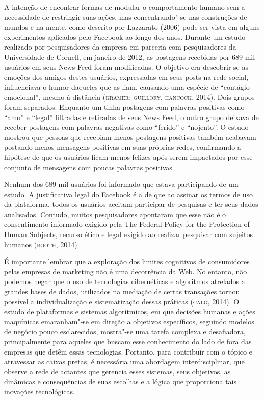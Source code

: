 A intenção de encontrar formas de modular o comportamento humano sem a
necessidade de restringir suas ações, mas concentrando"-se nas
construções de mundos e na mente, como descrito por Lazzarato (2006)
pode ser vista em alguns experimentos aplicados pelo Facebook ao longo
dos anos. Durante um estudo realizado por pesquisadores da empresa em
parceria com pesquisadores da Universidade de Cornell, em janeiro de
2012, as postagens recebidas por 689 mil usuários em seus News Feed
foram modificadas. O objetivo era descobrir se as emoções dos amigos
destes usuários, expressadas em seus posts na rede social, influenciava
o humor daqueles que as liam, causando uma espécie de ``contágio
emocional'', mesmo à distância (\textsc{kramer}; \textsc{guillory}, \textsc{hancock}, 2014). Dois
grupos foram separados. Enquanto um tinha postagens com palavras
positivas como ``amo'' e ``legal'' filtradas e retiradas de seus News
Feed, o outro grupo deixava de receber postagens com palavras negativas
como ``ferido'' e ``nojento''. O estudo mostrou que pessoas que recebiam
menos postagens positivas também acabavam postando menos mensagens
positivas em suas próprias redes, confirmando a hipótese de que os
usuários ficam menos felizes após serem impactados por esse conjunto de
mensagens com poucas palavras positivas.

Nenhum dos 689 mil usuários foi informado que estava participando de um
estudo. A justificativa legal do Facebook é a de que ao assinar os
termos de uso da plataforma, todos os usuários aceitam participar de
pesquisas e ter seus dados analisados. Contudo, muitos pesquisadores
apontaram que esse não é o consentimento informado exigido pela The
Federal Policy for the Protection of Human Subjects, recurso ético e
legal exigido ao realizar pesquisar com sujeitos humanos (\textsc{booth}, 2014).

É importante lembrar que a exploração dos limites cognitivos de
consumidores pelas empresas de marketing não é uma decorrência da Web.
No entanto, não podemos negar que o uso de tecnologias cibernéticas e
algoritmos atrelados a grandes bases de dados, utilizados na mediação de
certas transações tornou possível a individualização e sistematização
dessas práticas (\textsc{calo}, 2014). O estudo de plataformas e sistemas
algorítmicos, em que decisões humanas e ações maquínicas emaranham"-se em
direção a objetivos específicos, seguindo modelos de negócio pouco
esclarecidos, mostra"-se uma tarefa complexa e desafiadora,
principalmente para aqueles que buscam esse conhecimento do lado de fora
das empresas que detêm essas tecnologias. Portanto, para contribuir com
o tópico e atravessar as caixas pretas, é necessária uma abordagem
interdisciplinar, que observe a rede de actantes que gerencia esses
sistemas, seus objetivos, as dinâmicas e consequências de suas escolhas
e a lógica que proporciona tais inovações tecnológicas.


